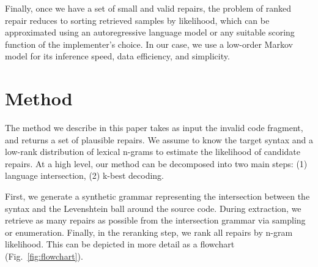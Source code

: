 \documentclass[sigplan,review,acmsmall,nonacm,anonymous]{acmart}\settopmatter{printfolios=false,printccs=false,printacmref=false}
\begin{document}
  Finally, once we have a set of small and valid repairs, the problem of ranked repair reduces to sorting retrieved samples by likelihood, which can be approximated using an autoregressive language model or any suitable scoring function of the implementer's choice. In our case, we use a low-order Markov model for its inference speed, data efficiency, and simplicity.

  \clearpage\section{Method}

  The method we describe in this paper takes as input the invalid code fragment, and returns a set of plausible repairs. We assume to know the target syntax and a low-rank distribution of lexical n-grams to estimate the likelihood of candidate repairs. At a high level, our method can be decomposed into two main steps: (1) language intersection, (2) k-best decoding.

First, we generate a synthetic grammar representing the intersection between the syntax and the Levenshtein ball around the source code. During extraction, we retrieve as many repairs as possible from the intersection grammar via sampling or enumeration. Finally, in the reranking step, we rank all repairs by n-gram likelihood. This can be depicted in more detail as a flowchart (Fig.~\ref{fig:flowchart}).
\end{document}
